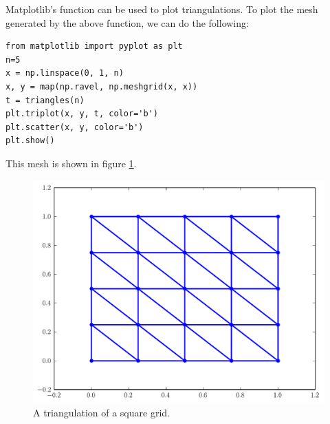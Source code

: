 Matplotlib's  function can be used to plot triangulations.
To plot the mesh generated by the above function, we can do the following:
\begin{lstlisting}
from matplotlib import pyplot as plt
n=5
x = np.linspace(0, 1, n)
x, y = map(np.ravel, np.meshgrid(x, x))
t = triangles(n)
plt.triplot(x, y, t, color='b')
plt.scatter(x, y, color='b')
plt.show()
\end{lstlisting}
This mesh is shown in figure \ref{fig:fem2d_square_triangulation}.

\begin{figure}
\includegraphics[width=\textwidth]{square_triangulation.pdf}
\caption{A triangulation of a square grid.}
\label{fig:fem2d_square_triangulation}
\end{figure}

